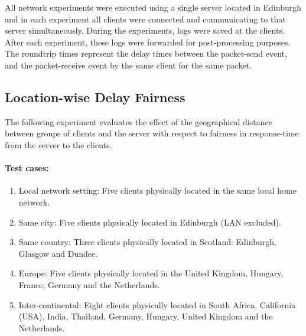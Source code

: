 \documentclass[bsc,frontabs,twoside,singlespacing,parskip,deptreport]{infthesis}     %
\begin{document}
All network experiments were executed using a single server located in Edinburgh and in each experiment all clients were connected and communicating to that server simultaneously. During the experiments, logs were saved at the clients. After each experiment, these logs were forwarded for post-processing purposes. The roundtrip times represent the delay times between the packet-send event, and the packet-receive event by the same client for the same packet.

\subsection{Location-wise Delay Fairness}
The following experiment evaluates the effect of the geographical distance between groups of clients and the server with respect to fairness in response-time from the server to the clients.

\paragraph*{Test cases:}
\begin{enumerate}
\item Local network setting: Five clients physically located in the same local home network.

\item Same city: Five clients physically located in Edinburgh (LAN excluded).

\item Same country: Three clients physically located in Scotland: Edinburgh, Glasgow and Dundee.

\item Europe: Five clients physically located in the United Kingdom, Hungary, France, Germany and the Netherlands.

\item Inter-continental: Eight clients physically located in South Africa, California (USA), India, Thailand, Germany, Hungary, United Kingdom and the Netherlands.

\end{enumerate}
\end{document}

